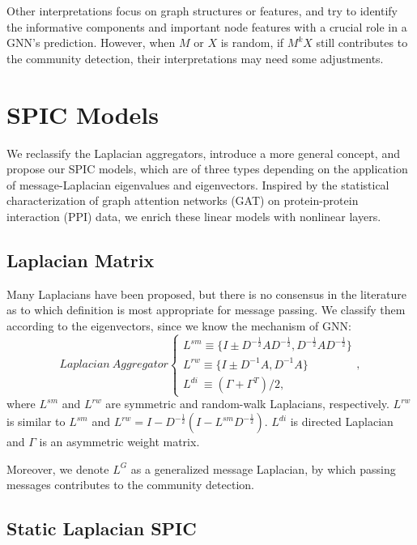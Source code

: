 \documentclass[preprint,11pt]{elsarticle}
\begin{document}
Other interpretations \cite{ref12, ref13, ref14, ref15} focus on graph structures or features, and try to identify the informative components and important node features with a crucial role in a GNN’s prediction. However, when $M$ or $X$ is random, if  $M^k X$ still contributes to the community detection, their interpretations may need some adjustments. 


\section{SPIC Models}

We reclassify the Laplacian aggregators, introduce a more general concept, and propose our SPIC models, which are of three types depending on the application of message-Laplacian eigenvalues and eigenvectors. Inspired by the statistical characterization of graph attention networks (GAT) on protein-protein interaction (PPI) data, we enrich these linear models with nonlinear layers.

\subsection{Laplacian Matrix}

Many Laplacians have been proposed, but there is no consensus in the literature as to which definition is most appropriate for message passing. We classify them according to the eigenvectors, since we know the mechanism of GNN:
\begin{equation}
Laplacian \  Aggregator
\left\{ 
\begin{array}{l}
L^{sm} \equiv \{I \pm D^{-\frac{1}{2}}AD^{-\frac{1}{2}}, D^{-\frac{1}{2}}AD^{-\frac{1}{2}} \}\\
L^{rw} \equiv \{I \pm D^{-1}A, D^{-1}A\}\\
L^{di} \ \equiv (\Gamma + \Gamma^T)/2 ,
\end{array}
\right.
,
\end{equation}
where $L^{sm}$ and $L^{rw}$ are symmetric and random-walk Laplacians, respectively. $L^{rw}$ is similar to $L^{sm}$ and $L^{rw}=I-D^{-\frac{1}{2}}(I-L^{sm}D^{-\frac{1}{2}})$. $L^{di}$ is directed Laplacian  \cite{ref16} and $\Gamma$ is an asymmetric weight matrix.

Moreover, we denote $L^G$ as a generalized message Laplacian, by which passing messages contributes to the community detection. 

\subsection{Static Laplacian SPIC}
\end{document}
